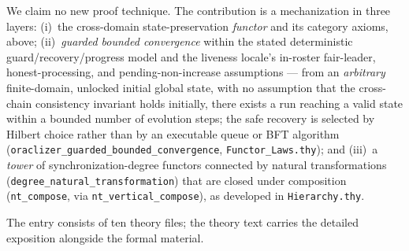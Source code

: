\documentclass[11pt,a4paper]{article}
\begin{document}
We claim no new proof technique.  The contribution is a mechanization in
three layers:
(i)~the cross-domain state-preservation \emph{functor} and its category axioms,
above;
  (ii)~\emph{guarded bounded convergence} within the stated deterministic
  guard/recovery/progress model and the liveness locale's in-roster fair-leader,
  honest-processing, and pending-non-increase assumptions
--- from an \emph{arbitrary} finite-domain, unlocked initial global state,
with no assumption that the
cross-chain consistency invariant holds initially, there exists a run reaching
a valid state within a bounded number of evolution steps; the safe recovery is
selected by Hilbert choice rather than by an executable queue or BFT algorithm
(\texttt{oraclizer\_guarded\_bounded\_convergence},
\texttt{Functor\_Laws.thy}); and
(iii)~a \emph{tower} of synchronization-degree functors connected by natural
transformations (\texttt{degree\_natural\_transformation}) that are closed
under composition (\texttt{nt\_compose}, via \texttt{nt\_vertical\_compose}),
as developed in \texttt{Hierarchy.thy}.

The entry consists of ten theory files; the theory text carries the
detailed exposition alongside the formal material.
\end{document}
